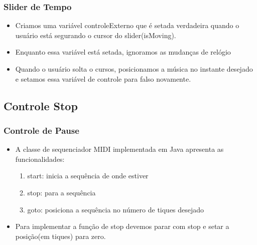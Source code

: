 \documentclass{beamer}
\begin{document}
\begin{frame}
  \frametitle{Slider de Tempo}
  \begin{itemize}
   \item Criamos uma variável controleExterno que é setada verdadeira quando o usuário está segurando
   o cursor do slider(isMoving). 
   \item Enquanto essa variável está setada, ignoramos as mudanças de relógio
   \item Quando o usuário solta o cursos, posicionamos a música no instante desejado e 
   setamos essa variável de controle para falso novamente.
  \end{itemize}
\end{frame}

\subsection{Controle Stop}
\begin{frame}
  \frametitle{Controle de Pause}
  \begin{itemize}
   \item A classe de sequenciador MIDI implementada em Java apresenta as funcionalidades:
    \begin{enumerate}
     \item start: inicia a sequência de onde estiver
     \item stop: para a sequência
     \item goto: posiciona a sequência no número de tiques desejado
    \end{enumerate}
    \item Para implementar a função de stop devemos parar com stop e setar a posição(em tiques) para
    zero.
  \end{itemize}
\end{frame}
\end{document}
